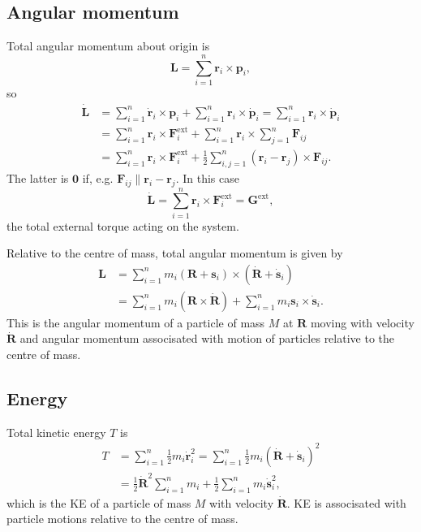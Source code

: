 \subsection{Angular momentum}
Total angular momentum about origin is 
\[
    \mathbf{L} = \sum_{i=1}^{n} \mathbf{r}_i \times \mathbf{p}_i,
\]
so
\begin{align*}
    \dot{\mathbf{L}} &= \sum_{i=1}^{n}\dot{\mathbf{r}}_i \times \mathbf{p}_i + \sum_{i=1}^{n} \mathbf{r}_i \times \dot{\mathbf{p}}_i = \sum_{i=1}^{n} \mathbf{r}_i \times \dot{\mathbf{p}}_i\\ 
    &= \sum_{i=1}^{n}\mathbf{r}_i \times \mathbf{F}_i^{\text{ext}}+\sum_{i=1}^{n}\mathbf{r}_i \times \sum_{j=1}^{n}\mathbf{F}_{ij}\\ 
    &= \sum_{i=1}^{n}\mathbf{r}_i \times \mathbf{F}_i^{\text{ext}}+\frac{1}{2}\sum_{i,j=1}^{n} (\mathbf{r}_i-\mathbf{r}_j)\times \mathbf{F}_{ij}.
\end{align*}
The latter is $\mathbf{0}$ if, e.g. $ \mathbf{F}_{ij}\parallel \mathbf{r}_i-\mathbf{r}_j $. In this case 
\[
    \dot{\mathbf{L}} = \sum_{i=1}^{n}\mathbf{r}_i \times \mathbf{F}_i^{\text{ext}} = \mathbf{G}^{\text{ext}},
\]
the total external torque acting on the system.

Relative to the centre of mass, total angular momentum is given by 
\begin{align*}
    \mathbf{L} &= \sum_{i=1}^{n} m_i(\mathbf{R}+\mathbf{s}_i) \times (\dot{\mathbf{R}}+\dot{\mathbf{s}}_i)\\ 
    &= \sum_{i=1}^{n}m_i (\mathbf{R} \times \dot{\mathbf{R}})+\sum_{i=1}^{n}m_i \mathbf{s}_i \times \dot{\mathbf{s}}_i.
\end{align*}
This is the angular momentum of a particle of mass $M$ at $ \mathbf{R} $ moving with velocity $ \dot{\mathbf{R}} $ and angular momentum associsated with motion of particles relative to the centre of mass.

\subsection{Energy}
Total kinetic energy $T$ is 
\begin{align*}
    T &= \sum_{i=1}^{n}\frac{1}{2}m_i \dot{\mathbf{r}}_i^2 = \sum_{i=1}^{n} \frac{1}{2}m_i (\dot{\mathbf{R}}+\dot{\mathbf{s}}_i)^2\\ 
    &= \frac{1}{2} \dot{\mathbf{R}}^2 \sum_{i=1}^{n}m_i+\frac{1}{2}\sum_{i=1}^{n}m_i \dot{\mathbf{s}}_i^2,
\end{align*}
which is the KE of a particle of mass $M$ with velocity $ \dot{\mathbf{R}} $. KE is associsated with particle motions relative to the centre of mass.

